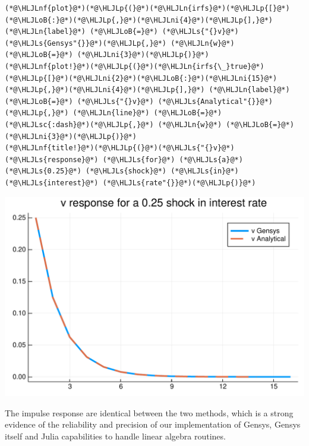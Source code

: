 \documentclass[12pt,a4paper]{article}
\newcommand{\HLJLn}[1]{#1}
\newcommand{\HLJLnf}[1]{\textcolor[RGB]{66,102,213}{#1}}
\newcommand{\HLJLs}[1]{\textcolor[RGB]{201,61,57}{#1}}
\newcommand{\HLJLsc}[1]{\textcolor[RGB]{201,61,57}{#1}}
\newcommand{\HLJLni}[1]{\textcolor[RGB]{59,151,46}{#1}}
\newcommand{\HLJLoB}[1]{\textcolor[RGB]{102,102,102}{\textbf{#1}}}
\newcommand{\HLJLp}[1]{#1}
\begin{document}
\begin{lstlisting}
(*@\HLJLnf{plot}@*)(*@\HLJLp{(}@*)(*@\HLJLn{irfs}@*)(*@\HLJLp{[}@*)(*@\HLJLoB{:}@*)(*@\HLJLp{,}@*)(*@\HLJLni{4}@*)(*@\HLJLp{],}@*) (*@\HLJLn{label}@*) (*@\HLJLoB{=}@*) (*@\HLJLs{"{}v}@*) (*@\HLJLs{Gensys"{}}@*)(*@\HLJLp{,}@*) (*@\HLJLn{w}@*) (*@\HLJLoB{=}@*) (*@\HLJLni{3}@*)(*@\HLJLp{)}@*)
(*@\HLJLnf{plot!}@*)(*@\HLJLp{(}@*)(*@\HLJLn{irfs{\_}true}@*)(*@\HLJLp{[}@*)(*@\HLJLni{2}@*)(*@\HLJLoB{:}@*)(*@\HLJLni{15}@*)(*@\HLJLp{,}@*)(*@\HLJLni{4}@*)(*@\HLJLp{],}@*) (*@\HLJLn{label}@*) (*@\HLJLoB{=}@*) (*@\HLJLs{"{}v}@*) (*@\HLJLs{Analytical"{}}@*)(*@\HLJLp{,}@*) (*@\HLJLn{line}@*) (*@\HLJLoB{=}@*) (*@\HLJLsc{:dash}@*)(*@\HLJLp{,}@*) (*@\HLJLn{w}@*) (*@\HLJLoB{=}@*) (*@\HLJLni{3}@*)(*@\HLJLp{)}@*)
(*@\HLJLnf{title!}@*)(*@\HLJLp{(}@*)(*@\HLJLs{"{}v}@*) (*@\HLJLs{response}@*) (*@\HLJLs{for}@*) (*@\HLJLs{a}@*) (*@\HLJLs{0.25}@*) (*@\HLJLs{shock}@*) (*@\HLJLs{in}@*) (*@\HLJLs{interest}@*) (*@\HLJLs{rate"{}}@*)(*@\HLJLp{)}@*)
\end{lstlisting}

\includegraphics[width=\linewidth]{figures/gensys_14_1.pdf}

The impulse response are identical between the two methods, which is a strong evidence of the reliability and precision of our implementation of Gensys, Gensys itself and Julia capabilities to handle linear algebra routines.
\end{document}
